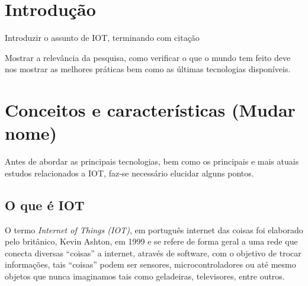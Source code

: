\documentclass[
article,			%
12pt,				%
oneside,			%
a4paper,			%
english,			%
brazil,				%
sumario=tradicional
]{abntex2}
\begin{document}


\textual
\section{Introdução}

Introduzir o assunto de IOT, terminando com citação

Mostrar a relevância da pesquisa, como verificar o que o mundo tem feito deve nos mostrar as melhores práticas bem como as últimas tecnologias disponíveis.

\section{Conceitos e características (Mudar nome)}\label{Conceitos Importantes}
Antes de abordar as principais tecnologias, bem como os principais e mais atuais estudos relacionados a IOT, faz-se necessário elucidar alguns pontos.
\subsection{O que é IOT}\label{O que é IOT}

O termo \textit{Internet of Things (IOT)}, em português internet das coisas foi elaborado pelo britânico, Kevin Ashton, em 1999\cite{5} e se refere de forma geral a uma rede que conecta diversas ``coisas'' a internet, através de software, com o objetivo de trocar informações\cite{defIot}, tais ``coisas'' podem ser sensores, microcontroladores ou até mesmo objetos que nunca imaginamos tais como geladeiras, televisores, entre outros.
\end{document}
